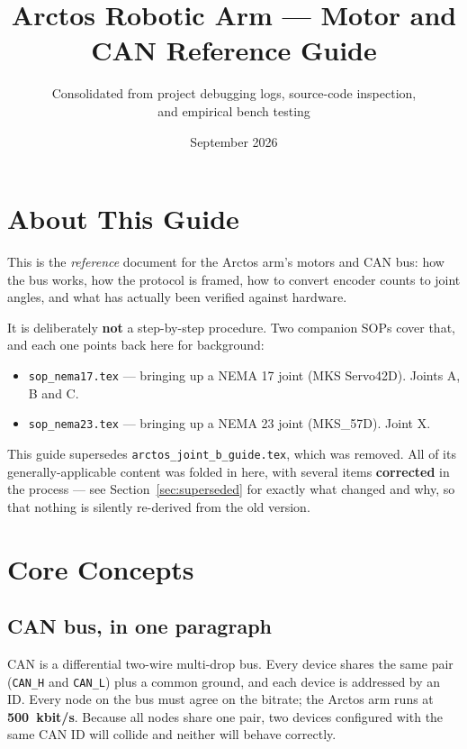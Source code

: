 \documentclass[11pt,letterpaper]{article}
\title{Arctos Robotic Arm --- Motor and CAN Reference Guide}
\author{Consolidated from project debugging logs, source-code inspection, \\ and empirical bench testing}
\date{September 2026}
\begin{document}
\maketitle
\tableofcontents
\newpage

\section{About This Guide}
This is the \emph{reference} document for the Arctos arm's motors and CAN bus: how
the bus works, how the protocol is framed, how to convert encoder counts to joint
angles, and what has actually been verified against hardware.

It is deliberately \textbf{not} a step-by-step procedure. Two companion SOPs cover
that, and each one points back here for background:

\begin{itemize}
    \item \texttt{sop\_nema17.tex} --- bringing up a NEMA 17 joint (MKS Servo42D).
          Joints A, B and C.
    \item \texttt{sop\_nema23.tex} --- bringing up a NEMA 23 joint (MKS\_57D).
          Joint X.
\end{itemize}

This guide supersedes \texttt{arctos\_joint\_b\_guide.tex}, which was removed. All
of its generally-applicable content was folded in here, with several items
\textbf{corrected} in the process --- see Section~\ref{sec:superseded} for exactly
what changed and why, so that nothing is silently re-derived from the old version.

\section{Core Concepts}

\subsection{CAN bus, in one paragraph}
CAN is a differential two-wire multi-drop bus. Every device shares the same pair
(\texttt{CAN\_H} and \texttt{CAN\_L}) plus a common ground, and each device is
addressed by an ID. Every node on the bus must agree on the bitrate; the Arctos arm
runs at \textbf{500~kbit/s}. Because all nodes share one pair, two devices
configured with the same CAN ID will collide and neither will behave correctly.
\end{document}
